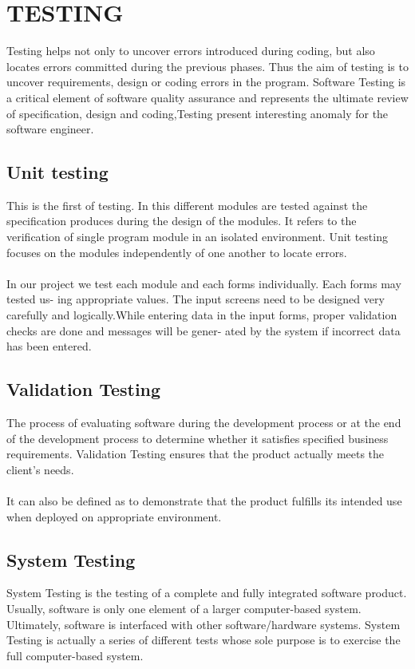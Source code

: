 \documentclass[a4paper, 12pt]{report}
\begin{document}
\section{TESTING}
Testing helps not only to uncover errors introduced during coding, but also locates errors committed during the previous phases. Thus the aim of testing is to uncover requirements, design or coding errors in the program. Software Testing is a critical element of software quality assurance and represents the ultimate review of speciﬁcation, design and coding,Testing present interesting anomaly for the software engineer.
\subsection{Unit testing}
This is the ﬁrst of testing. In this diﬀerent modules are tested against the speciﬁcation produces during the design of the modules. It refers to the veriﬁcation of single program module in an isolated environment. Unit testing focuses on the modules independently of one another to locate errors.\paragraph{}
In our project we test each module and each forms individually. Each forms may tested us- ing appropriate values. The input screens need to be designed very carefully and logically.While entering data in the input forms, proper validation checks are done and messages will be gener- ated by the system if incorrect data has been entered.
\subsection{Validation Testing}
The process of evaluating software during the development process or at the end of the development process to determine whether it satisfies specified business requirements. Validation Testing ensures that the product actually meets the client's needs.\paragraph{}
 It can also be defined as to demonstrate that the product fulfills its intended use when deployed on appropriate environment.
\subsection{System Testing}
System Testing is the testing of a complete and fully integrated software product. Usually, software is only one element of a larger computer-based system. Ultimately, software is interfaced with other software/hardware systems. System Testing is actually a series of different tests whose sole purpose is to exercise the full computer-based system.
\newpage
\end{document}
